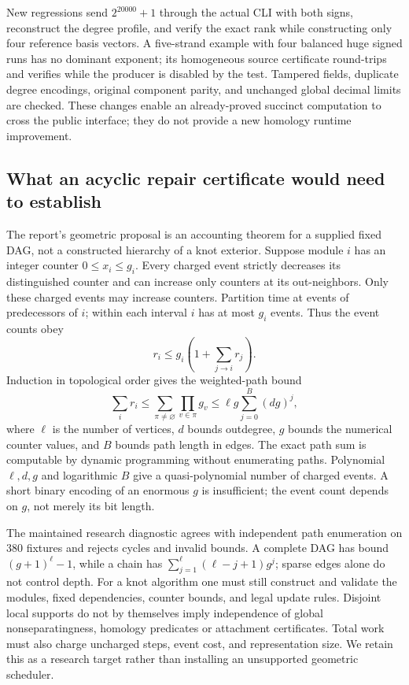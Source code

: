 New regressions send $2^{20000}+1$ through the actual CLI with both signs,
reconstruct the degree profile, and verify the exact rank while constructing
only four reference basis vectors.  A five-strand example with four balanced
huge signed runs has no dominant exponent; its homogeneous source certificate
round-trips and verifies while the producer is disabled by the test.
Tampered fields, duplicate degree encodings, original component parity,
and unchanged global decimal limits are checked.  These changes enable an
already-proved succinct computation to cross the public interface; they
do not provide a new homology runtime improvement.

\subsection{What an acyclic repair certificate would need to establish}
The report's geometric proposal is an accounting theorem for a supplied
fixed DAG, not a constructed hierarchy of a knot exterior.  Suppose module
$i$ has an integer counter $0\le x_i\le g_i$.  Every charged event strictly
decreases its distinguished counter and can increase only counters at its
out-neighbors. Only these charged events may increase counters.
Partition time at events of predecessors of $i$; within
each interval $i$ has at most $g_i$ events.  Thus the event counts obey
\[
 r_i\le g_i\left(1+\sum_{j\to i}r_j\right).
\]
Induction in topological order gives the weighted-path bound
\[
 \sum_i r_i\le\sum_{\pi\ne\varnothing}\prod_{v\in\pi}g_v
 \le \ell g\sum_{j=0}^{B}(dg)^j,
\]
where $\ell$ is the number of vertices, $d$ bounds outdegree, $g$ bounds
the numerical counter values, and $B$ bounds path length in edges.
The exact path sum is computable by dynamic programming without enumerating
paths.  Polynomial $\ell,d,g$ and logarithmic $B$ give a quasi-polynomial
number of charged events.  A short binary encoding of an enormous $g$ is
insufficient; the event count depends on $g$, not merely its bit length.

The maintained research diagnostic agrees with independent path enumeration
on 380 fixtures and rejects cycles and invalid bounds.  A complete DAG has
bound $(g+1)^\ell-1$, while a chain has
$\sum_{j=1}^{\ell}(\ell-j+1)g^j$; sparse edges alone do not control depth.
For a knot algorithm one must still construct and validate the modules,
fixed dependencies, counter bounds, and legal update rules.  Disjoint local
supports do not by themselves imply independence of global nonseparatingness,
homology predicates or attachment certificates.  Total work must also charge
uncharged steps, event cost, and representation size.  We retain this as a
research target rather than installing an unsupported geometric scheduler.
